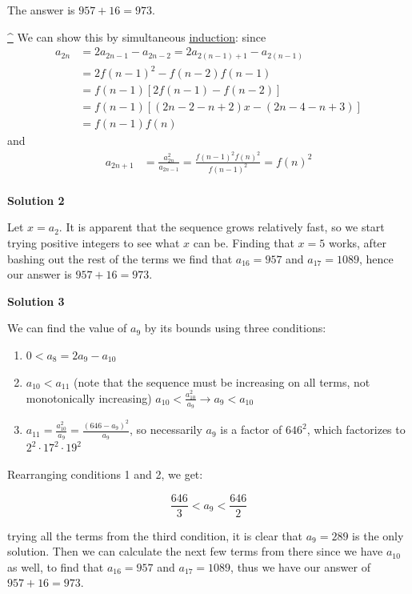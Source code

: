 \begin{enumerate}
 The answer is $957 + 16 = \boxed{973}$.

 \href{https://artofproblemsolving.com\#ref\_1}{\textasciicircum{}} We can show this by simultaneous \href{https://artofproblemsolving.com/wiki/index.php?title=Induction}{induction}: since 
 \begin{align*}a_{2n} &= 2a_{2n-1} - a_{2n-2} = 2a_{2(n-1)+1} - a_{2(n-1)} \\ &= 2f(n-1)^2 - f(n-2)f(n-1) \\ &= f(n-1)[2f(n-1) - f(n-2)] \\ &= f(n-1)[(2n-2-n+2)x-(2n-4-n+3)] \\ &= f(n-1)f(n) \end{align*}
and
 \begin{align*}a_{2n+1} &= \frac{a_{2n}^2}{a_{2n-1}} = \frac{f(n-1)^2f(n)^2}{f(n-1)^2} = f(n)^2 \\ \end{align*}





\textbf{Solution 2}

Let $x = a_2$. It is apparent that the sequence grows relatively fast, so we start trying positive integers to see what $x$ can be. Finding that $x = 5$ works, after bashing out the rest of the terms we find that $a_{16} = 957$ and $a_{17} = 1089$, hence our answer is $957 + 16 = \boxed{973}$.

 



\textbf{Solution 3}

We can find the value of $a_{9}$ by its bounds using three conditions:

 
            \begin{enumerate}
        \item $0<a_{8} = 2a_{9}-a_{10}$
        \item $a_{10} < a_{11}$ (note that the sequence must be increasing on all terms, not monotonically increasing) $a_{10} < \frac{a_{10}^2}{a_{9}} \rightarrow a_{9} < a_{10}$
        \item $a_{11} = \frac{a_{10}^2}{a_{9}} = \frac{(646-a_{9})^2}{a_{9}}$, so necessarily $a_{9}$ is a factor of $646^2$, which factorizes to $2^2\cdot 17^2 \cdot 19^2$
            \end{enumerate}
            Rearranging conditions 1 and 2, we get:

 
 \[\frac{646}{3} < a_{9} < \frac{646}{2}\]

 trying all the terms from the third condition, it is clear that $a_9 = 289$ is the only solution. Then we can calculate the next few terms from there since we have $a_{10}$ as well, to find that $a_{16} = 957$ and $a_{17} = 1089$, thus we have our answer of $957 + 16 = \boxed{973}$.


\end{enumerate}
